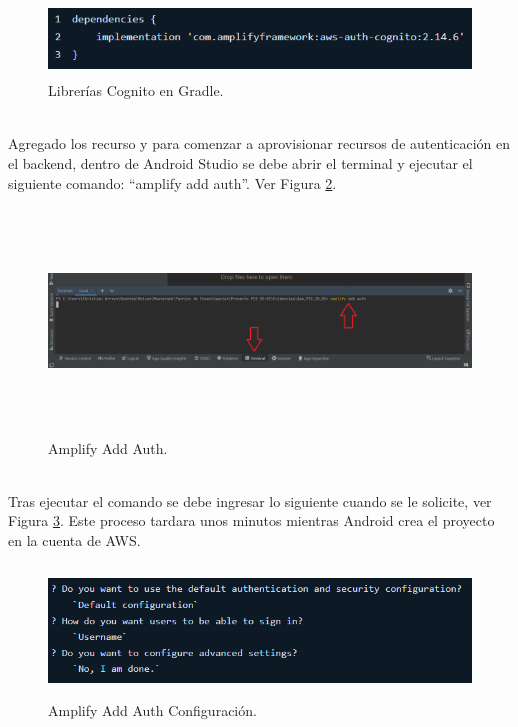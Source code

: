 \documentclass[a4paper,10pt, oneside, titlepage]{article}
\begin{document}
	\begin{figure}[!h]
		\centering
		\includegraphics[width = 1\linewidth, height = 2cm]{Librerias_Gradle_Cognito.png}
		\caption{Librerías Cognito en Gradle.}
		\label{Librerias_Gradle_Cognito}
	\end{figure} \\
	\indent Agregado los recurso y para comenzar a aprovisionar recursos de autenticación en el backend, dentro de Android Studio se debe abrir el terminal y ejecutar el siguiente comando: ``amplify add auth''. Ver Figura \ref{Amplify_Add_Auth}.
	\begin{figure}[!h]
		\centering
		\includegraphics[width = 1\linewidth, height = 6cm]{Amplify_Add_Auth.png}
		\caption{Amplify Add Auth.}
		\label{Amplify_Add_Auth}
	\end{figure} \\
	\indent Tras ejecutar el comando se debe ingresar lo siguiente cuando se le solicite, ver Figura \ref{Amplify_Add_Auth_Configuracion}. Este proceso tardara unos minutos mientras Android crea el proyecto en la cuenta de AWS.
	\begin{figure}[!h]
		\centering
		\includegraphics[width = 1\linewidth, height = 3.5cm]{Amplify_Add_Auth_Configuracion.png}
		\caption{Amplify Add Auth Configuración.}
		\label{Amplify_Add_Auth_Configuracion}
	\end{figure} \\
\end{document}
